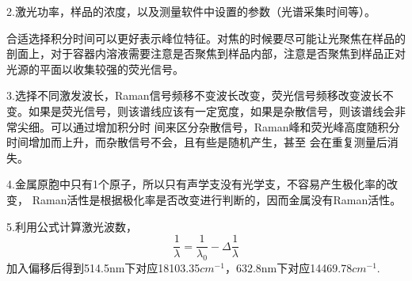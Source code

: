 \documentclass{article}
\begin{document}
	
	2.激光功率，样品的浓度，以及测量软件中设置的参数（光谱采集时间等）。
	
	
	合适选择积分时间可以更好表示峰位特征。对焦的时候要尽可能让光聚焦在样品的剖面上，对于容器内溶液需要注意是否聚焦到样品内部，注意是否聚焦到样品正对光源的平面以收集较强的荧光信号。
	
	
	3.选择不同激发波长，Raman信号频移不变波长改变，荧光信号频移改变波长不变。如果是荧光信号，则该谱线应该有一定宽度，如果是杂散信号，则该谱线会非常尖细。可以通过增加积分时
	间来区分杂散信号，Raman峰和荧光峰⾼度随积分时间增加⽽上升，⽽杂散信号不会，且有些是随机产生，甚⾄
	会在重复测量后消失。


	4.金属原胞中只有1个原子，所以只有声学支没有光学支，不容易产生极化率的改变，
	Raman活性是根据极化率是否改变进行判断的，因而金属没有Raman活性。
	
	
	5.利用公式计算激光波数，
	\begin{equation}
		\frac{1}{\lambda}=\frac{1}{\lambda_0}-\Delta\frac{1}{\lambda}
	\end{equation}
	加入偏移后得到514.5nm下对应18103.35$cm^{-1}$，632.8nm下对应14469.78$cm^{-1}$.
\end{document}
